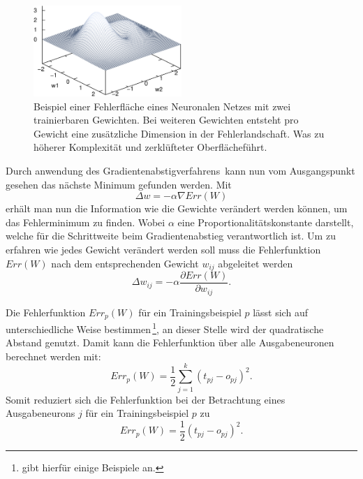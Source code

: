 \begin{figure}[tb]
    \centering
        \includegraphics[width=0.5\textwidth]{Bilder/misc/Fehlerlandschaft.png}
    \caption{Beispiel einer Fehlerfläche eines Neuronalen Netzes mit zwei trainierbaren Gewichten. Bei weiteren Gewichten entsteht pro Gewicht eine zusätzliche Dimension in der Fehlerlandschaft. Was zu höherer Komplexität und zerklüfteter \glqq Oberfläche\grqq führt.\protect\footnotemark{}}
    \label{fig:Fehlerlandschaft}
\end{figure}
\addtocounter{footnote}{-1}     %
\addtocounter{Hfootnote}{-1}    %
\wrapfigfoot{}

Durch anwendung des Gradientenabstigverfahrens\, kann nun vom Ausgangspunkt gesehen das nächste Minimum gefunden werden. Mit
\begin{equation}
\Delta w = - \alpha \nabla Err(W)
\end{equation}
erhält man nun die Information wie die Gewichte verändert werden können, um das Fehlerminimum zu finden.
Wobei $\alpha$ eine Proportionalitätskonstante darstellt, welche für die Schrittweite beim Gradientenabstieg verantwortlich ist.
Um zu erfahren wie jedes Gewicht verändert werden soll muss die Fehlerfunktion $Err(W)$ nach dem entsprechenden Gewicht $w_{ij}$ abgeleitet werden
\begin{equation}
\Delta w_{ij} = - \alpha \frac{\partial Err(W)}{\partial w_{ij}} .
\label{gl:gewaend}
\end{equation}

Die Fehlerfunktion $Err_p(W)$ für ein Trainingsbeispiel $p$ lässt sich auf unterschiedliche Weise bestimmen\,\footnote{\citet[60 f]{dkriesel07} gibt hierfür einige Beispiele an.}, an dieser Stelle wird der quadratische Abstand genutzt. Damit kann die Fehlerfunktion über alle Ausgabeneuronen berechnet werden mit:
\begin{equation}
Err_p(W)= \frac{1}{2} \sum^k_{j=1} (t_{pj}-o_{pj})^2 .
\end{equation}
Somit reduziert sich die Fehlerfunktion bei der Betrachtung eines Ausgabeneurons $j$ für ein Trainingsbeispiel $p$ zu
\begin{equation}
Err_p(W)= \frac{1}{2} (t_{pj}-o_{pj})^2 .
\label{gl:errp}
\end{equation}


